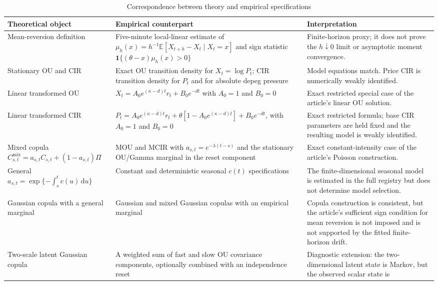 \documentclass[11pt]{article}
\newcommand{\E}{\mathbb{E}}
\newcommand{\1}{\mathbf{1}}
\newcommand{\dd}{\,\mathrm{d}}
\begin{document}
\begin{table}[htbp]
\centering
\caption{Correspondence between theory and empirical specifications}
\label{emp:tab:alignment}
\begin{threeparttable}
\small
\begin{tabular}{p{}p{}p{}}
\toprule
Theoretical object & Empirical counterpart & Interpretation \\
\midrule
Mean-reversion definition & Five-minute local-linear estimate of
$\mu_h(x)=h^{-1}\E[X_{t+h}-X_t\mid X_t=x]$ and sign statistic
$\1\{(\theta-x)\mu_h(x)>0\}$ & Finite-horizon proxy; it does not prove the
$h\downarrow0$ limit or asymptotic moment convergence. \\
Stationary OU and CIR & Exact OU transition density for $X_t=\log P_t$; CIR
transition density for $P_t$ and for absolute depeg pressure & Model equations
match.  Price CIR is numerically weakly identified. \\
Linear transformed OU &
$X_t=A_0e^{(\kappa-d)t}r_t+B_0e^{-dt}$ with $A_0=1$ and $B_0=0$ & Exact
restricted special case of the article's linear OU solution. \\
Linear transformed CIR &
$P_t=A_0e^{(\kappa-d)t}r_t+\theta[1-A_0e^{(\kappa-d)t}]+B_0e^{-dt}$,
with $A_0=1$ and $B_0=0$ & Exact restricted formula; base CIR parameters are
held fixed and the resulting model is weakly identified. \\
Mixed copula
$C^{\mathrm{mix}}_{s,t}=a_{s,t}C_{s,t}+(1-a_{s,t})\Pi$ & MOU and MCIR with
$a_{s,t}=e^{-\lambda(t-s)}$ and the stationary OU/Gamma marginal in the reset
component & Exact constant-intensity case of the article's Poisson construction. \\
General $a_{s,t}=\exp\{-\int_s^t c(u)\dd u\}$ & Constant and deterministic
seasonal $c(t)$ specifications & The finite-dimensional seasonal model is
estimated in the full registry but does not determine model selection. \\
Gaussian copula with a general marginal & Gaussian and mixed Gaussian copulas
with an empirical marginal & Copula construction is consistent, but the
article's sufficient sign condition for mean reversion is not imposed and is
not supported by the fitted finite-horizon drift. \\
Two-scale latent Gaussian copula & A weighted sum of fast and slow OU covariance
components, optionally combined with an independence reset & Diagnostic extension:
the two-dimensional latent state is Markov, but the observed scalar state is

\end{tabular}
\end{threeparttable}
\end{table}
\end{document}
